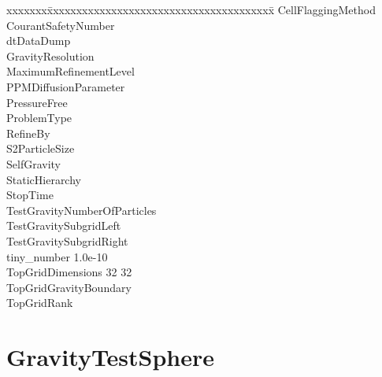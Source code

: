 \documentclass{book}
\begin{document}
{\parametersize
\begin{tabbing}
xxxxxxx\=xxxxxxxxxxxxxxxxxxxxxxxxxxxxxxxxxxxxxxx\=\kill
\> CellFlaggingMethod        \\
\> CourantSafetyNumber          \\
\> dtDataDump              \\
\> GravityResolution       \\
\> MaximumRefinementLevel         \\
\> PPMDiffusionParameter          \\
\> PressureFree                   \\
\> ProblemType                   \\
\> RefineBy                       \\
\> S2ParticleSize          \\
\> SelfGravity                    \\
\> StaticHierarchy                \\
\> StopTime                \\
\> TestGravityNumberOfParticles  \\
\> TestGravitySubgridLeft           \\
\> TestGravitySubgridRight          \\
\> tiny\_number            \> 1.0e-10  \\
\> TopGridDimensions       32 32 \\
\> TopGridGravityBoundary         \\
\> TopGridRank            
\end{tabbing}}

\subsection{\cello}

\section{GravityTestSphere} \label{s:GravityTestSphere}

\end{document}
